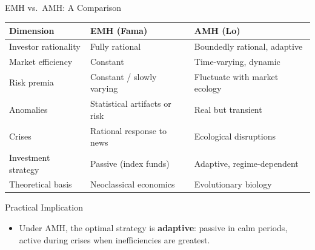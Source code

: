 \documentclass[9pt, aspectratio=169, t]{beamer}
\theoremstyle{definition}
\newenvironment{cminipage}[1]{%
    \par\noindent\hfill\begin{minipage}{#1}\ignorespaces
}{%
    \end{minipage}\hfill\null\par
}
\begin{document}
\begin{frame}{EMH vs.\ AMH: A Comparison}
\begin{cminipage}{0.95\textwidth}
\scriptsize
\renewcommand{\arraystretch}{1.3}
\begin{center}
\begin{tabular}{lll}
\toprule
\textbf{Dimension} & \textbf{EMH (Fama)} & \textbf{AMH (Lo)} \\
\midrule
Investor rationality & Fully rational & Boundedly rational, adaptive \\
Market efficiency & Constant & Time-varying, dynamic \\
Risk premia & Constant / slowly varying & Fluctuate with market ecology \\
Anomalies & Statistical artifacts or risk & Real but transient \\
Crises & Rational response to news & Ecological disruptions \\
Investment strategy & Passive (index funds) & Adaptive, regime-dependent \\
Theoretical basis & Neoclassical economics & Evolutionary biology \\
\bottomrule
\end{tabular}
\end{center}

\vspace{0.2cm}
\begin{exampleblock}{Practical Implication}
\begin{itemize}\setlength{\itemsep}{0pt}
    \item Under AMH, the optimal strategy is \textbf{adaptive}: passive in calm periods, active during crises when inefficiencies are greatest.
\end{itemize}
\end{exampleblock}
\end{cminipage}
\end{frame}
\end{document}
